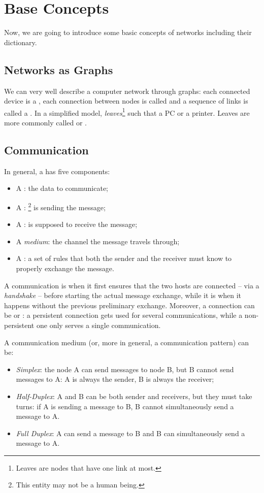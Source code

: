 \section{Base Concepts}
Now, we are going to introduce some basic concepts of networks including their dictionary.

\subsection{Networks as Graphs}
We can very well describe a computer network through graphs: each connected device is a , each connection between nodes is called  and a sequence of links is called a .
In a simplified model, \emph{leaves}\footnote{Leaves are nodes that have one link at most.} such that a PC or a printer. Leaves are more commonly called  or .

\subsection{Communication}
In general, a  has five components:
\begin{itemize}
    \item A : the data to communicate;
    \item A : \footnote{This entity may not be a human being.} is sending the message;
    \item A :  is supposed to receive the message;
    \item A \emph{medium}: the channel the message travels through;
    \item A : a set of rules that both the sender and the receiver must know to properly exchange the message.
\end{itemize}

A communication is  when it first ensures that the two hosts are connected -- via a \emph{handshake} -- before starting the actual message exchange, while it is  when it happens without the previous preliminary exchange.
Moreover, a connection can be  or : a persistent connection gets used for several communications, while a non-persistent one only serves a single communication.

A communication medium (or, more in general, a communication pattern) can be:
\begin{itemize}
    \item \emph{Simplex}: the node A can send messages to node B, but B cannot send messages to A: A is always the sender, B is always the receiver;
    \item \emph{Half-Duplex}: A and B can be both sender and receivers, but they must take turns: if A is sending a message to B, B cannot simultaneously send a message to A.
    \item \emph{Full Duplex}: A can send a message to B and B can simultaneously send a message to A.
\end{itemize}

